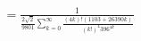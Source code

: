 \documentclass[preview]{standalone}
\begin{document}
\begin{align*}
= \frac{1}{\frac{2\sqrt{2}}{9801} \sum_{k=0}^{\infty} \frac{(4k)!(1103+26390k)}{(k!)^4 396^{4k}}}
\end{align*}
\end{document}
